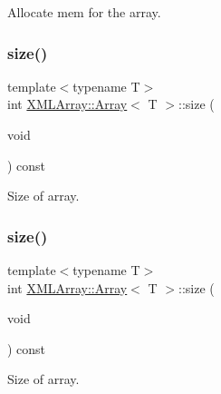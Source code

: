 Allocate mem for the array. 

\mbox{\label{classXMLArray_1_1Array_ab59904c2aa0e31c18c6cd5f5a186e292}} 
\subsubsection{\texorpdfstring{size()}{size()}\hspace{0.1cm}{\footnotesize\ttfamily [1/2]}}
{\footnotesize\ttfamily template$<$typename T$>$ \\
int \mbox{\hyperlink{classXMLArray_1_1Array}{X\+M\+L\+Array\+::\+Array}}$<$ T $>$\+::size (\begin{DoxyParamCaption}\item[{void}]{ }\end{DoxyParamCaption}) const\hspace{0.3cm}{\ttfamily [inline]}}



Size of array. 

\mbox{\label{classXMLArray_1_1Array_ab59904c2aa0e31c18c6cd5f5a186e292}} 
\subsubsection{\texorpdfstring{size()}{size()}\hspace{0.1cm}{\footnotesize\ttfamily [2/2]}}
{\footnotesize\ttfamily template$<$typename T$>$ \\
int \mbox{\hyperlink{classXMLArray_1_1Array}{X\+M\+L\+Array\+::\+Array}}$<$ T $>$\+::size (\begin{DoxyParamCaption}\item[{void}]{ }\end{DoxyParamCaption}) const\hspace{0.3cm}{\ttfamily [inline]}}



Size of array. 

